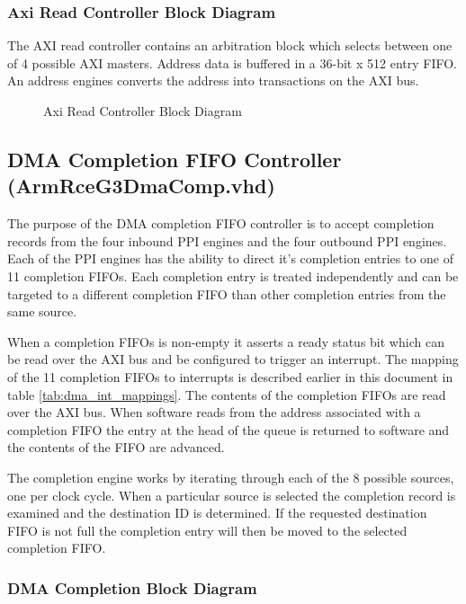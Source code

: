 \documentclass[11pt]{article}
\begin{document}
\subsubsection{Axi Read Controller Block Diagram}

The AXI read controller contains an arbitration block which selects between one of 4 possible AXI masters. Address data is 
buffered in a 36-bit x 512 entry FIFO. An address engines converts the address into transactions on the AXI bus. 

\begin{figure}[H]
   \centering
   \caption{Axi Read Controller Block Diagram}
   \label{fig:axi_read_block}
\end{figure}

\subsection{DMA Completion FIFO Controller (ArmRceG3DmaComp.vhd)}
\label{subsec:ArmRceG3DmaComp}

The purpose of the DMA completion FIFO controller is to accept completion records from the four inbound PPI engines and the four outbound PPI engines. 
Each of the PPI engines has the ability to direct it's completion entries to one of 11 completion FIFOs. Each completion entry is treated independently 
and can be targeted to a different completion FIFO than other completion entries from the same source. 

When a completion FIFOs is non-empty it asserts a ready status bit which can be read over the AXI bus and be configured to trigger an interrupt. 
The mapping of the 11 completion FIFOs to interrupts is described earlier in this document in table \ref{tab:dma_int_mappings}. The contents of
the completion FIFOs are read over the AXI bus. When software reads from the address associated with a completion FIFO the entry at the head of
the queue is returned to software and the contents of the FIFO are advanced. 

The completion engine works by iterating through each of the 8 possible sources, one per clock cycle. When a particular source is selected the
completion record is examined and the destination ID is determined. If the requested destination FIFO is not full the completion entry will 
then be moved to the selected completion FIFO. 


\subsubsection{DMA Completion Block Diagram}
\end{document}

